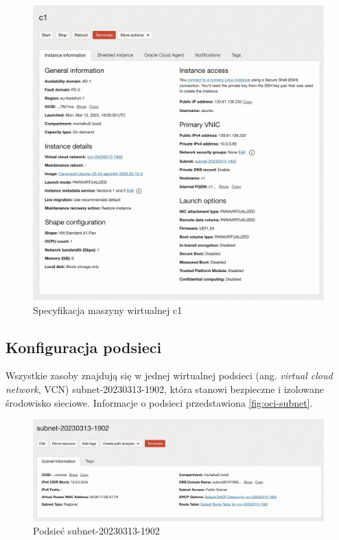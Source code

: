 \begin{figure}[H]
    \centering
    \includegraphics[width=\textwidth]{img/oci-instance-details}
    \caption{Specyfikacja maszyny wirtualnej c1}
    \label{fig:oci-instance-details}
\end{figure}

\subsection{Konfiguracja podsieci}

Wszystkie zasoby znajdują się w jednej wirtualnej podsieci (ang. \emph{virtual cloud network}, VCN) subnet-20230313-1902, która stanowi bezpieczne i izolowane środowisko sieciowe.
Informacje o podsieci przedstawiona \autoref{fig:oci-subnet}.

\begin{figure}[H]
    \centering
    \includegraphics[width=\textwidth]{img/oci-subnet}
    \caption{Podsieć subnet-20230313-1902}
    \label{fig:oci-subnet}
\end{figure}

